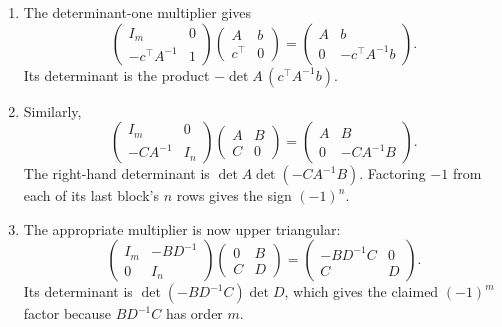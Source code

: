 \begin{solution}
\begin{enumerate}
\item The determinant-one multiplier gives
\[
\begin{pmatrix}I_m&0\\-c^\top A^{-1}&1\end{pmatrix}
\begin{pmatrix}A&b\\c^\top&0\end{pmatrix}
=\begin{pmatrix}A&b\\0&-c^\top A^{-1}b\end{pmatrix}.
\]
Its determinant is the product \(-\det A\,(c^\top A^{-1}b)\).
\item Similarly,
\[
\begin{pmatrix}I_m&0\\-CA^{-1}&I_n\end{pmatrix}
\begin{pmatrix}A&B\\C&0\end{pmatrix}
=\begin{pmatrix}A&B\\0&-CA^{-1}B\end{pmatrix}.
\]
The right-hand determinant is \(\det A\det(-CA^{-1}B)\).
Factoring \(-1\) from each of its last block's \(n\) rows gives the sign \((-1)^n\).
\item The appropriate multiplier is now upper triangular:
\[
\begin{pmatrix}I_m&-BD^{-1}\\0&I_n\end{pmatrix}
\begin{pmatrix}0&B\\C&D\end{pmatrix}
=\begin{pmatrix}-BD^{-1}C&0\\C&D\end{pmatrix}.
\]
Its determinant is \(\det(-BD^{-1}C)\det D\), which gives the claimed
\((-1)^m\) factor because \(BD^{-1}C\) has order \(m\).
\end{enumerate}
\end{solution}

